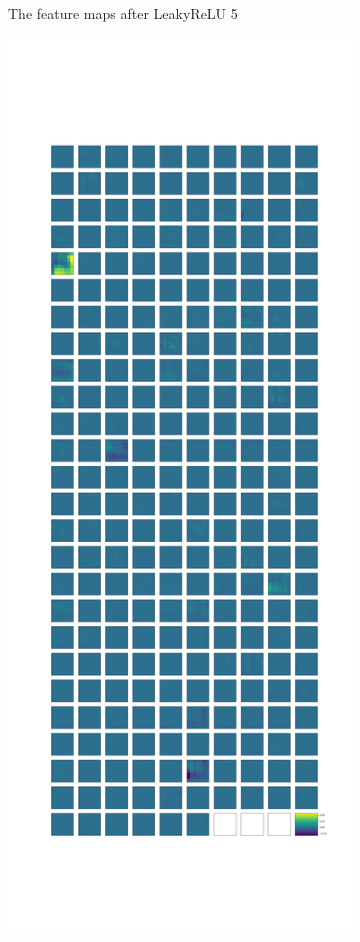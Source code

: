 \documentclass[11pt]{article}
\begin{document}
\begin{figure}
\begin{subfigure}{0.3\textwidth}
            \caption{The feature maps after LeakyReLU 5}
            \label{subfig:lakyrelu5}
        \end{subfigure}
        \hfill
        \begin{subfigure}{0.3\textwidth}
            \centering
            \includegraphics[width=\textwidth]{images/stripes/max_pooling2d_3.png}

\end{subfigure}
\end{figure}
\end{document}

